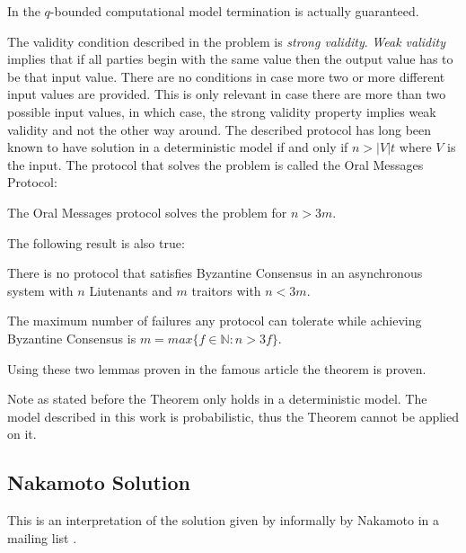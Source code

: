 \documentclass[..]{subfiles}
\begin{document}
\begin{remark}
	In the $q$-bounded computational model termination is actually guaranteed.
\end{remark}

The validity condition described in the problem is \textit{strong validity}. \textit{Weak validity} implies that if all parties begin with the same value then the output value has to be that input value. There are no conditions in case more two or more different input values are provided. This is only relevant in case there are more than two possible input values, in which case, the strong validity property implies weak validity and not the other way around. The described protocol has long been known to have solution in a deterministic model if and only if $n > |V|t$ where $V$ is the input. The protocol that solves the problem is called the Oral Messages Protocol:
\begin{lemma}
	The Oral Messages protocol solves the problem for $n>3m$.
\end{lemma}

The following result is also true:
\begin{lemma}
	There is no protocol that satisfies Byzantine Consensus in an asynchronous system with $n$ Liutenants and $m$ traitors with $n<3m$.
\end{lemma}

\begin{theorem}
	The maximum number of failures any protocol can tolerate while achieving Byzantine Consensus is $m = max\{f \in \mathbb{N} : n>3f\}$.
\end{theorem}
Using these two lemmas proven in the famous article \cite{pease1980reaching} the theorem is proven.

\begin{remark}
	Note as stated before the Theorem only holds in a deterministic model. The model described in this work is probabilistic, thus the Theorem cannot be applied on it.
\end{remark}


\subsection{Nakamoto Solution}

This is an interpretation of the solution given by informally by Nakamoto in a mailing list \cite{nakamoto_mail}.
\end{document}
